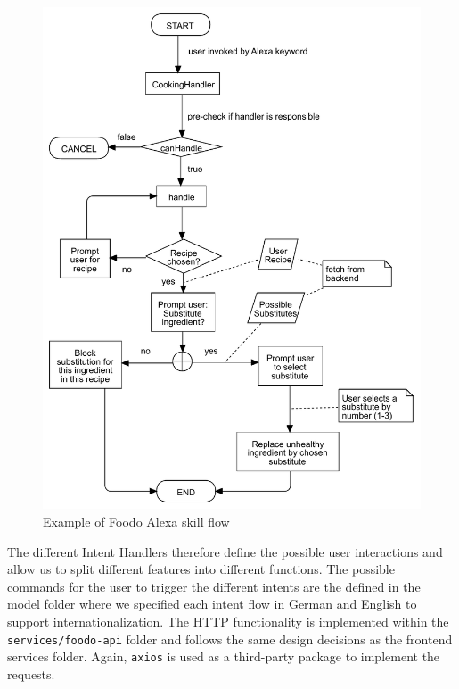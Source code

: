 \begin{figure}[ht]
	\captionsetup{justification=centering}
	\begin{center}
	\includegraphics[scale=0.6]{Ressourcen/img/alexa-flow}
	\caption{Example of Foodo Alexa skill flow}
\end{center}
\end{figure}

The different Intent Handlers therefore define the possible user interactions and allow us to split different features into different functions. The possible commands for the user to trigger the different intents are the defined in the model folder where we specified each intent flow in German and English to support internationalization. The HTTP functionality is implemented within the \texttt{services/foodo-api} folder and follows the same design decisions as the frontend services folder. Again, \texttt{axios} is used as a third-party package to implement the requests. 

